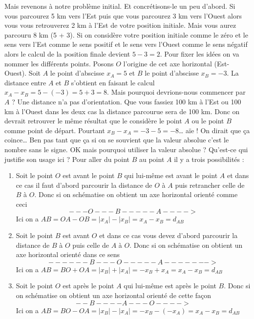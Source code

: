 \documentclass[a4paper, 11pt, twoside]{article}
\begin{document}
Mais revenons à notre problème initial. Et concrétisons-le un peu
d'abord. Si vous parcourez 5 km vers l'Est puis que vous parcourez
3 km vers l'Ouest alors vous vous retrouverez 2 km à l'Est de votre
position initiale. Mais vous aurez parcouru 8 km (5 + 3). Si on
considère votre position initiale comme le zéro et le sens vers
l'Est comme le sens positif et le sens vers l'Ouest comme le sens
négatif alors le calcul de la position finale devient \(5 - 3 =
   2\). Pour fixer les idées on va nommer les différents points. Posons
\(O\) l'origine de cet axe horizontal (Est-Ouest). Soit \(A\) le point
d'abscisse \(x_A = 5\) et \(B\) le point d'abscisse \(x_B = -3\). La
distance entre \(A\) et \(B\) s'obtient en faisant le calcul \(x_A - x_B
   = 5 - (-3) = 5 + 3 = 8\). Mais pourquoi devrions-nous commencer par
\(A\) ? Une distance n'a pas d'orientation. Que vous fassiez 100 km à
l'Est ou 100 km à l'Ouest dans les deux cas la distance parcourue
sera de 100 km. Donc on devrait retrouver le même résultat que le
considère le point \(A\) ou le point \(B\) comme point de
départ. Pourtant \(x_B - x_A = -3 - 5 = -8\)\ldots{} aïe ! On dirait que
ça coince\ldots{} Ben pas tant que ça si on se souvient que la valeur
absolue c'est le nombre sans le signe. OK mais pourquoi utiliser la
valeur absolue ? Qu'est-ce qui justifie son usage ici ? Pour aller
du point \(B\) au point \(A\) il y a trois possibilités :
\begin{enumerate}
\item Soit le point \(O\) est avant le point \(B\) qui lui-même est avant
le point \(A\) et dans ce cas il faut d'abord parcourir la
distance de \(O\) à \(A\) puis retrancher celle de \(B\) à \(O\). Donc
si on schématise on obtient un axe horizontal orienté comme ceci
\[---O---B-----A---->\]
Ici on a \(AB = OA - OB = |x_A| - |x_B| = x_A - x_B = d_{AB}\)
\item Soit le point \(B\) est avant \(O\) et dans ce cas vous devez
d'abord parcourir la distance de \(B\) à \(O\) puis celle de \(A\) à
\(O\). Donc si on schématise on obtient un axe horizontal orienté
dans ce sens \[------B---O-----A------->\]
Ici on a \(AB = BO + OA = \lvert x_B \rvert + \lvert x_A \rvert =
      -x_B + x_A = x_A - x_B = d_{AB}\)
\item Soit le point \(O\) est après le point \(A\) qui lui-même est après
le point \(B\). Donc si on schématise on obtient un axe horizontal
orienté de cette façon \[--B----A---O---->\]
Ici on a \(AB = BO - OA = |x_B| - |x_A| = -x_B - (-x_A) = x_A -
      x_B = d_{AB}\)
\end{enumerate}
\end{document}
